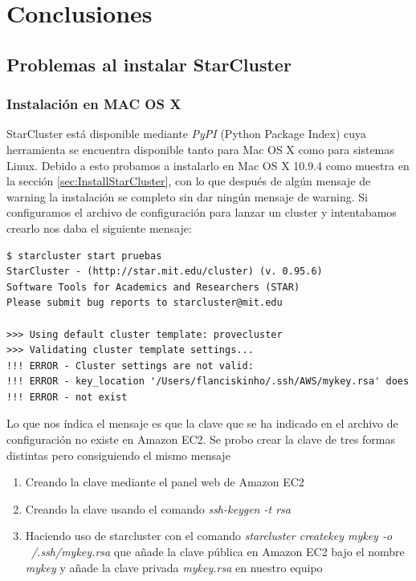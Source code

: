 \documentclass{article}
\begin{document}
\clearpage
\section{Conclusiones}

\subsection{Problemas al instalar StarCluster}

\subsubsection{Instalación en MAC OS X}
	StarCluster está disponible mediante \emph{PyPI} (Python Package Index) cuya herramienta se encuentra disponible tanto para Mac OS X como para sistemas Linux. Debido a esto probamos a instalarlo en Mac OS X 10.9.4 como muestra en la sección \ref{sec:InstallStarCluster}, con lo que después de algún mensaje de warning la instalación se completo sin dar ningún mensaje de warning. Si configuramos el archivo de configuración para lanzar un cluster y intentabamos crearlo nos daba el siguiente mensaje:
\begin{lstlisting}[style=miniBash]
$ starcluster start pruebas
StarCluster - (http://star.mit.edu/cluster) (v. 0.95.6)
Software Tools for Academics and Researchers (STAR)
Please submit bug reports to starcluster@mit.edu

>>> Using default cluster template: provecluster
>>> Validating cluster template settings...
!!! ERROR - Cluster settings are not valid:
!!! ERROR - key_location '/Users/flanciskinho/.ssh/AWS/mykey.rsa' does
!!! ERROR - not exist
\end{lstlisting}
Lo que nos índica el mensaje es que la clave que se ha indicado en el archivo de configuración no existe en Amazon EC2. Se probo crear la clave de tres formas distintas pero consiguiendo el mismo mensaje
\begin{enumerate}
	\item Creando la clave mediante el panel web de Amazon EC2
	\item Creando la clave usando el comando \emph{ssh-keygen -t rsa}
	\item Haciendo uso de starcluster con el comando \emph{starcluster createkey mykey -o ~/.ssh/mykey.rsa} que añade la clave pública en Amazon EC2 bajo el nombre \emph{mykey} y añade la clave privada \emph{mykey.rsa} en nuestro equipo
\end{enumerate}
\end{document}
